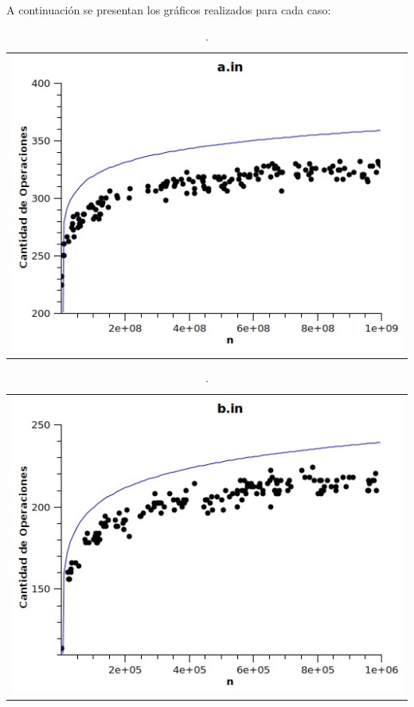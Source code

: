 \paragraph{}
A continuación se presentan los gráficos realizados para cada caso:
	\begin{table}[ht]
		\centering 
			\begin{tabular}{c}
				\includegraphics[scale = 0.8]{./../ej1/tests/a.jpg}
			\end{tabular}
			\caption{.}
			\label{grafico1} 
	\end{table}

	\begin{table}[ht]
		\centering 
			\begin{tabular}{c}
				\includegraphics[scale = 0.8]{./../ej1/tests/b.jpg}
			\end{tabular}
			\caption{.} 
			\label{grafico2} 
	\end{table}

